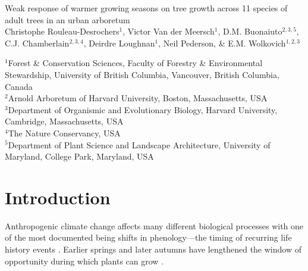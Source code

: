 \documentclass{article}\usepackage[]{graphicx}\usepackage[]{xcolor}
\begin{document}

\begin{center}
{\sc} {\Large Weak response of warmer growing seasons on tree growth across 11 species of adult trees in an urban arboretum} \\
\vspace{5ex}
{\sc} Christophe Rouleau-Desrochers$^1$, Victor Van der Meersch$^1$, D.M. Buonaiuto$^{2,3,5}$, C.J. Chamberlain$^{2,3,4}$, Deirdre Loughnan$^1$, Neil Pederson, \& E.M. Wolkovich$^{1,2,3}$
\end{center}
$^1$Forest \& Conservation Sciences, Faculty of Forestry \& Environmental Stewardship, University of British Columbia, Vancouver, British Columbia, Canada\\
$^2$Arnold Arboretum of Harvard University, Boston, Massachusetts, USA\\
$^3$Department of Organismic and Evolutionary Biology, Harvard University, Cambridge, Massachusetts, USA\\
$^4$The Nature Conservancy, USA\\
$^5$Department of Plant Science and Landscape Architecture, University of Maryland, College Park, Maryland, USA


\newcommand{\Arub}{\textit{A. rubrum}}
\newcommand{\Asac}{\textit{A. saccharum}}
\newcommand{\Afla}{\textit{A. flava}}
\newcommand{\Ball}{\textit{B. alleghaniensis}}
\newcommand{\Bnig}{\textit{B. nigra}}
\newcommand{\Cgla}{\textit{C. glabra}}
\newcommand{\Cova}{\textit{C. ovata}}
\newcommand{\Pdel}{\textit{P. deltoides}}
\newcommand{\Qalb}{\textit{Q. alba}}
\newcommand{\Qrub}{\textit{Q. rubra}}
\newcommand{\Tame}{\textit{T. americana}}   




\section{Introduction}
Anthropogenic climate change affects many different biological processes with one of the most documented being shifts in phenology---the timing of recurring life history events \citep{cleland_shifting_2007,menzel_european_2006,parmesan_poleward_1999}. Earlier springs and later autumns have lengthened the window of opportunity during which plants can grow \citep{duputie_phenological_2015}. 
\end{document}
